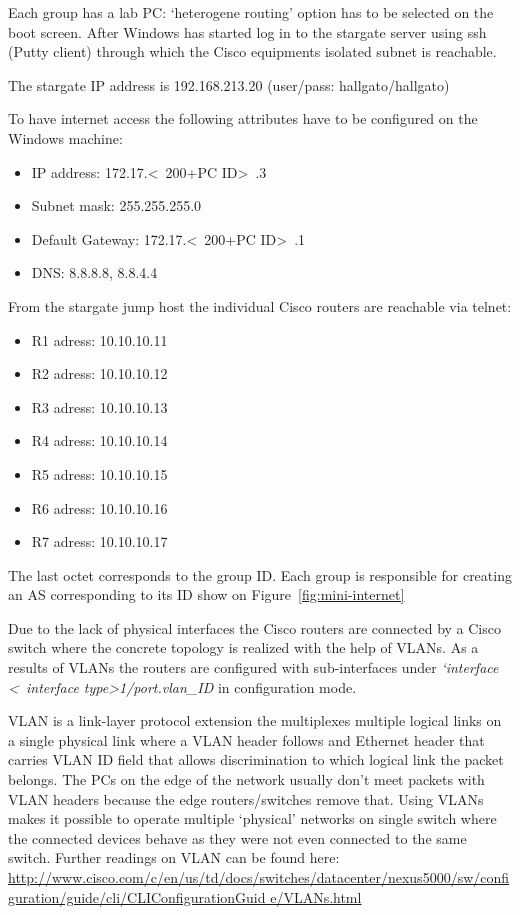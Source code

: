 \documentclass[a4paper]{article}
\begin{document}
Each group has a lab PC: `heterogene routing' option has to be selected on the boot screen. After Windows has started
log in to the stargate server using ssh (Putty client) through which the Cisco equipments isolated subnet is reachable.

The stargate IP address is 192.168.213.20 (user/pass: hallgato/hallgato)

To have internet access the following attributes have to be configured on the Windows machine:
\begin{itemize}
    \item IP address: 172.17.\textless~200+PC ID\textgreater~.3
    \item Subnet mask: 255.255.255.0
    \item Default Gateway: 172.17.\textless~200+PC ID\textgreater~.1
    \item DNS: 8.8.8.8, 8.8.4.4
\end{itemize}

From the stargate jump host the individual Cisco routers are reachable via telnet:
\begin{itemize}
    \item R1 adress: 10.10.10.11
    \item R2 adress: 10.10.10.12
    \item R3 adress: 10.10.10.13
    \item R4 adress: 10.10.10.14
    \item R5 adress: 10.10.10.15
    \item R6 adress: 10.10.10.16
    \item R7 adress: 10.10.10.17
\end{itemize}

The last octet corresponds to the group ID. Each group is responsible for creating an AS corresponding to its ID show
on Figure~\ref{fig:mini-internet}

Due to the lack of physical interfaces the Cisco routers are connected by a Cisco switch where the concrete topology is
realized with the help of VLANs. As a results of VLANs the routers are configured with sub-interfaces under
\emph{`interface \textless~interface type\textgreater 1/port.vlan\_ID} in configuration mode.

VLAN is a link-layer protocol extension the multiplexes multiple logical links on a single physical link where a VLAN
header follows and Ethernet header that carries VLAN ID field that allows discrimination to which logical link the
packet belongs. The PCs on the edge of the network usually don't meet packets with VLAN headers because the edge
routers/switches remove that. Using VLANs makes it possible to operate multiple `physical' networks on single switch
where the connected devices behave as they were not even connected to the same switch. Further readings on VLAN can be
found here:
\url{http://www.cisco.com/c/en/us/td/docs/switches/datacenter/nexus5000/sw/configuration/guide/cli/CLIConfigurationGuid
    e/VLANs.html}
\end{document}
